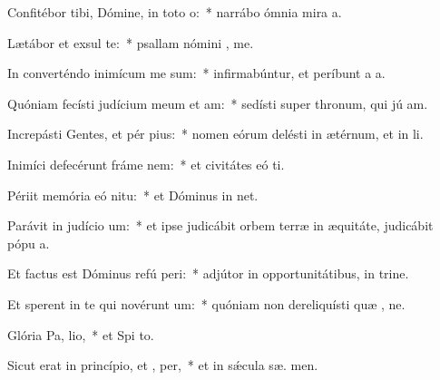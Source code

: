 \item Confitébor tibi, Dómine, in toto  o:~* narrábo ómnia mira a.
\item Lætábor et exsul  te:~* psallam nómini , me.
\item In converténdo inimícum me sum:~* infirmabúntur, et períbunt a  a.
\item Quóniam fecísti judícium meum et  am:~* sedísti super thronum, qui jú am.
\item Increpásti Gentes, et pér pius:~* nomen eórum delésti in ætérnum, et in  li.
\item Inimíci defecérunt fráme  nem:~* et civitátes eó ti.
\item Périit memória eó  nitu:~* et Dóminus in  net.
\item Parávit in judício  um:~* et ipse judicábit orbem terræ in æquitáte, judicábit pópu  a.
\item Et factus est Dóminus refú peri:~* adjútor in opportunitátibus, in trine.
\item Et sperent in te qui novérunt  um:~* quóniam non dereliquísti quæ , ne.
\item Glória Pa,  lio,~* et Spi to.
\item Sicut erat in princípio, et ,  per,~* et in sǽcula sæ. men.
